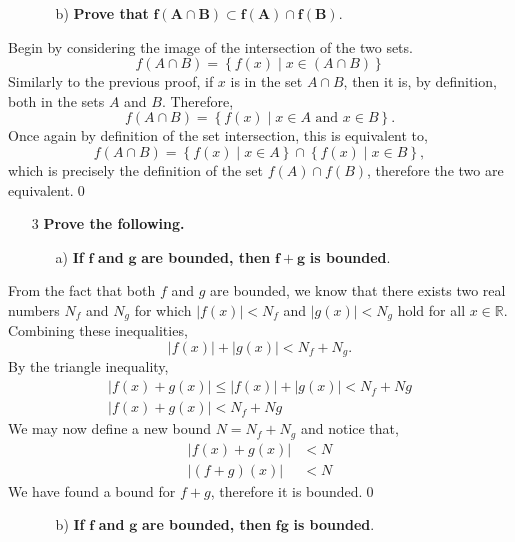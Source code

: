 \documentclass{amsart}
\begin{document}
\begin{enumerate}
    \item []
    \begin{itemize}
        \item [b)] \textbf{Prove that }$\mathbf{f(A\cap B)\subset f(A)\cap f(B)}$.
    \end{itemize}
\end{enumerate}
Begin by considering the image of the intersection of the two sets.
$$
f(A\cap B) = \left\{f(x) \mid x\in (A\cap B) \right\}
$$
Similarly to the previous proof, if $x$ is in the set $A\cap B$, then it is, by definition, both in the sets $A$ and $B$. Therefore,
$$
f(A\cap B) = \left\{f(x) \mid x\in A\textrm{ and }x\in B \right\}.
$$
Once again by definition of the set intersection, this is equivalent to,
$$
f(A\cap B) = \left\{f(x) \mid x\in A \right\}\cap \left\{f(x) \mid x\in B \right\},
$$
which is precisely the definition of the set $f(A)\cap f(B)$, therefore the two are equivalent.\qed
\\
\begin{enumerate}
    \item [3] \textbf{Prove the following.}
    \begin{itemize}
        \item [a)] \textbf{If }$\mathbf{f}$\textbf{ and }$\mathbf{g}$\textbf{ are bounded, then }$\mathbf{f+g}$\textbf{ is bounded}.
    \end{itemize}
\end{enumerate}
From the fact that both $f$ and $g$ are bounded, we know that there exists two real numbers $N_{f}$ and $N_{g}$ for which $|f(x)|<N_{f}$ and $|g(x)|<N_{g}$ hold for all $x\in \mathbb{R}$.\\
Combining these inequalities,
$$
|f(x)| + |g(x)| < N_{f} + N_{g}.
$$
By the triangle inequality,
\begin{gather*}
    |f(x) + g(x)| \le |f(x)| + |g(x)| < N_{f} + N{g}\\
    |f(x) + g(x)| < N_{f} + N{g}
\end{gather*}
We may now define a new bound $N = N_{f} + N_{g}$ and notice that,
\begin{align*}
|f(x) + g(x)| &< N\\
|(f+g)(x)| &< N
\end{align*}
We have found a bound for $f+g$, therefore it is bounded.\qed
\\

\begin{enumerate}
    \item []
    \begin{itemize}
        \item [b)] \textbf{If }$\mathbf{f}$\textbf{ and }$\mathbf{g}$\textbf{ are bounded, then }$\mathbf{fg}$\textbf{ is bounded}.
    \end{itemize}
\end{enumerate}
\end{document}
